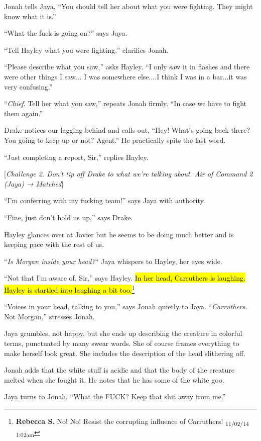 Jonah tells Jaya, ``You should tell her about what you were fighting. They might know what it is.''

``What the fuck is going on?'' says Jaya.

``Tell Hayley what you were fighting,'' clarifies Jonah.

``Please describe what you saw,'' asks Hayley.  ``I only saw it in flashes and there were other things I saw... I was somewhere else....I think I was in a bar...it was very confusing.''

``\textit{Chief}.  Tell her what you saw,'' repeats Jonah firmly.  ``In case we have to fight them again.''

Drake notices our lagging behind and calls out, ``Hey! What's going back there?  You going to keep up or not?  Agent.''  He practically spits the last word.

``Just completing a report, Sir,'' replies Hayley.

{[}\textit{Challenge 2.  Don't tip off Drake to what we're talking about.  Air of Command 2 (Jaya) → Matched}{]}

``I'm conferring with my fucking team!'' says Jaya with authority.

``Fine, just don't hold us up,'' says Drake.

Hayley glances over at Javier but he seems to be doing much better and is keeping pace with the rest of us.

``\textit{Is Morgan inside your head?}`` Jaya whispers to Hayley, her eyes wide.

``Not that I'm aware of, Sir,'' says Hayley.  \hl{In her head, Carruthers is laughing.  Hayley is startled into laughing a bit too.}\footnote{\textbf{Rebecca S. }No! No! Resist the corrupting influence of Carruthers! \textsubscript{11/02/14 1:02am}}

``Voices in your head, talking to you,'' says Jonah quietly to Jaya.    ``\textit{Carruthers. } Not Morgan,'' stresses Jonah.

Jaya grumbles, not happy, but she ends up describing the creature in colorful terms, punctuated by many swear words.  She of course frames everything to make herself look great.  She includes the description of the head slithering off. 

Jonah adds that the white stuff is acidic and that the body of the creature melted when she fought it.  He notes that he has some of the white goo.

Jaya turns to Jonah, ``What the FUCK?  Keep that shit away from me.''

